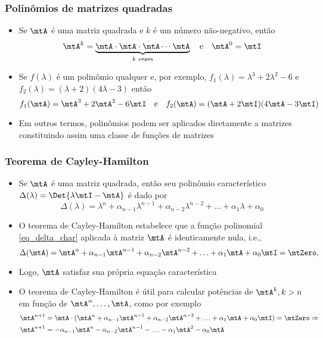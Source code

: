 \begin{frame}
  \frametitle{Polinômios de matrizes quadradas}
  \begin{itemize}
    \item Se $\mtA$ é uma matriz quadrada e $k$ é um número não-negativo, então
    \begin{equation}
      \mtA^k = \underbrace{\mtA\cdot\mtA\cdot\mtA\cdots\mtA}_{k \text{ vezes}} \quad \text{e} \quad \mtA^0 = \mtI
    \end{equation}
    \item Se $f(\lambda)$ é um polinômio qualquer e, por exemplo, $f_1(\lambda) = \lambda^3 + 2\lambda^2 - 6$ e $f_2(\lambda) = (\lambda+2)(4\lambda-3)$ então
    \begin{equation}
      f_1(\mtA) = \mtA^3 + 2\mtA^2 - 6\mtI \quad \text{e} \quad f_2(\mtA) = (\mtA+2\mtI)(4\mtA - 3\mtI)
    \end{equation}
    \item Em outros termos, polinômios podem ser aplicados diretamente a matrizes constituindo assim uma classe de funções de matrizes
  \end{itemize}
\end{frame}

\begin{frame}
  \frametitle{Teorema de Cayley-Hamilton}
  \begin{itemize}
    \item Se $\mtA$ é uma matriz quadrada, então seu polinômio característico $\Delta(\lambda) = \Det{\lambda\mtI - \mtA}$ é dado por
    \begin{equation}\label{eq_delta_char}
      \Delta(\lambda) = \lambda^n + \alpha_{n-1}\lambda^{n-1} + \alpha_{n-2}\lambda^{n-2} + \ldots + \alpha_{1}\lambda + \alpha_0
    \end{equation}
    \item O teorema de Cayley-Hamilton estabelece que a função polinomial \eqref{eq_delta_char} aplicada à matriz $\mtA$ é identicamente nula, i.e.,
    \begin{equation}\label{eq_cayley}
      \Delta(\mtA) = \mtA^n + \alpha_{n-1}\mtA^{n-1} + \alpha_{n-2}\mtA^{n-2} + \ldots + \alpha_{1}\mtA + \alpha_0\mtI = \mtZero,
    \end{equation}
    \item Logo, $\mtA$ satisfaz sua própria equação característica
    \item O teorema de Cayley-Hamilton é útil para calcular potências de $\mtA^{k}, k > n$ em função de $\mtA^n, \ldots, \mtA$, como por exemplo
    {\small\begin{equation}
      \begin{split}\label{eq_a_n_plus_one}
        \mtA^{n+1} &= \mtA\cdot(\mtA^n + \alpha_{n-1}\mtA^{n-1} + \alpha_{n-2}\mtA^{n-2} + \ldots + \alpha_{1}\mtA + \alpha_0\mtI) = \mtZero \Rightarrow \\
        \mtA^{n+1} &= -\alpha_{n-1}\mtA^{n} - \alpha_{n-2}\mtA^{n-1} - \ldots - \alpha_{1}\mtA^2 - \alpha_0\mtA
      \end{split}
    \end{equation}}
  \end{itemize}
\end{frame}

